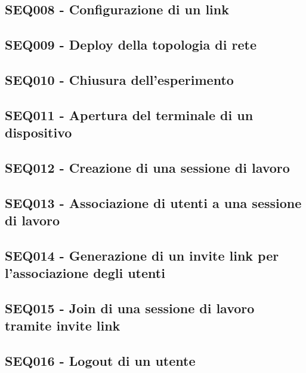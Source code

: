 \documentclass[../main.tex]{subfiles}
\begin{document}
\subsection{SEQ008 - Configurazione di un link }
\figure[H]
\centering

\endfigure
\vfill\newpage
\subsection{SEQ009 - Deploy della topologia di rete }
\figure[H]
\centering

\endfigure
\vfill\newpage
\subsection{SEQ010 - Chiusura dell'esperimento }
\figure[H]
\centering

\endfigure
\vfill\newpage
\subsection{SEQ011 - Apertura del terminale di un dispositivo }
\figure[H]
\centering

\endfigure
\vfill\newpage
\subsection{SEQ012 - Creazione di una sessione di lavoro }
\figure[H]
\centering

\endfigure
\vfill\newpage
\subsection{SEQ013 - Associazione di utenti a una sessione di lavoro }
\figure[H]
\centering

\endfigure
\vfill\newpage
\subsection{SEQ014 - Generazione di un invite link per l'associazione degli utenti }
\figure[H]
\centering

\endfigure
\vfill\newpage
\subsection{SEQ015 - Join di una sessione di lavoro tramite invite link }
\figure[H]
\centering

\endfigure
\vfill\newpage
\subsection{SEQ016 - Logout di un utente }
\figure[H]
\centering

\endfigure
\vfill\newpage
\end{document}
